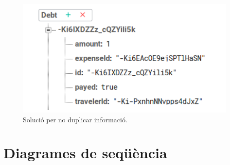 \begin{figure}[!h]
\centering
\includegraphics[scale=1.00]{Figures/DebtBD.jpg}
\caption{Solució per no duplicar informació.}
\end{figure}


\section{Diagrames de seqüència}
